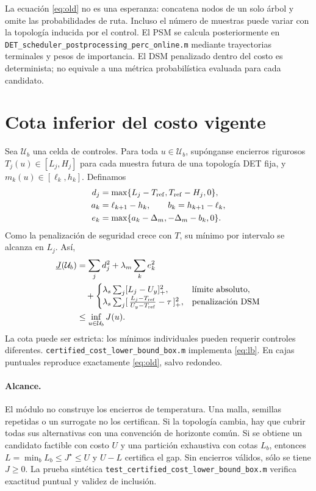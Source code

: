 \documentclass[11pt,a4paper]{article}
\begin{document}
La ecuación \eqref{eq:old} no es una esperanza: concatena nodos de un
solo árbol y omite las probabilidades de ruta. Incluso el número de
muestras puede variar con la topología inducida por el control.
El PSM se calcula posteriormente en
\nolinkurl{DET_scheduler_postprocessing_perc_online.m} mediante
trayectorias terminales y pesos de importancia. El DSM penalizado dentro
del costo es determinista; no equivale a una métrica probabilística
evaluada para cada candidato.

\section{Cota inferior del costo vigente}
Sea $\mathcal U_b$ una celda de controles. Para toda $u\in\mathcal U_b$,
supónganse encierros rigurosos
$T_j(u)\in[L_j,H_j]$ para cada muestra futura de una topología DET fija,
y $m_k(u)\in[\ell_k,h_k]$. Definamos
\[
\begin{aligned}
d_j&=\max\{L_j-T_{\rm ref},T_{\rm ref}-H_j,0\},\\
a_k&=\ell_{k+1}-h_k,\qquad b_k=h_{k+1}-\ell_k,\\
e_k&=\max\{a_k-\Delta_m,-\Delta_m-b_k,0\}.
\end{aligned}
\]
Como la penalización de seguridad crece con $T$, su mínimo por intervalo
se alcanza en $L_j$. Así,
\begin{equation}
\begin{aligned}
\underline J(\mathcal U_b)
&=\sum_j d_j^2+\lambda_m\sum_k e_k^2\\
&\quad+
\begin{cases}
\lambda_s\sum_j[L_j-U_y]_+^2,&\text{límite absoluto},\\
\lambda_s\sum_j
 [\,\frac{L_j-T_{\rm ref}}{U_y-T_{\rm ref}}-\tau\,]_+^2,
 &\text{penalización DSM}
\end{cases}\\
&\leq\inf_{u\in\mathcal U_b}J(u).
\end{aligned}
\label{eq:lb}
\end{equation}
La cota puede ser estricta: los mínimos individuales pueden requerir
controles diferentes. \nolinkurl{certified_cost_lower_bound_box.m}
implementa \eqref{eq:lb}. En cajas puntuales reproduce exactamente
\eqref{eq:old}, salvo redondeo.

\paragraph{Alcance.}
El módulo no construye los encierros de temperatura. Una malla,
semillas repetidas o un surrogate no los certifican. Si la topología
cambia, hay que cubrir todas sus alternativas con una convención de
horizonte común. Si se obtiene un candidato factible con costo $U$ y
una partición exhaustiva con cotas $L_b$, entonces
$L=\min_bL_b\leq J^\star\leq U$ y $U-L$ certifica el gap.
Sin encierros válidos, sólo se tiene $J\geq0$.
La prueba sintética \nolinkurl{test_certified_cost_lower_bound_box.m}
verifica exactitud puntual y validez de inclusión.
\end{document}
